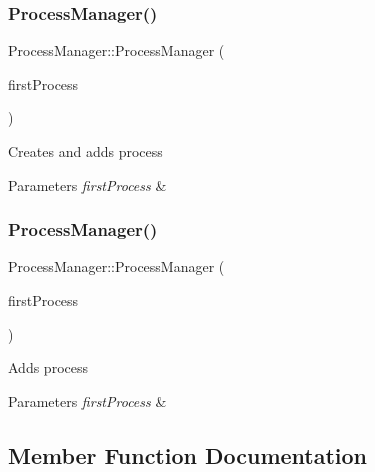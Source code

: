 \subsubsection{\texorpdfstring{Process\+Manager()}{ProcessManager()}\hspace{0.1cm}{\footnotesize\ttfamily [1/2]}}
{\footnotesize\ttfamily Process\+Manager\+::\+Process\+Manager (\begin{DoxyParamCaption}\item[{int}]{first\+Process }\end{DoxyParamCaption})}

Creates and adds process 
\begin{DoxyParams}{Parameters}
{\em first\+Process} & \\
\hline
\end{DoxyParams}
\mbox{\label{classProcessManager_ab8b145c5552462cbeb1b81cf085ac694}} 
\subsubsection{\texorpdfstring{Process\+Manager()}{ProcessManager()}\hspace{0.1cm}{\footnotesize\ttfamily [2/2]}}
{\footnotesize\ttfamily Process\+Manager\+::\+Process\+Manager (\begin{DoxyParamCaption}\item[{\hyperlink{classMemoryIndex}{Memory\+Index}}]{first\+Process }\end{DoxyParamCaption})}

Adds process 
\begin{DoxyParams}{Parameters}
{\em first\+Process} & \\
\hline
\end{DoxyParams}


\subsection{Member Function Documentation}
\mbox{\label{classProcessManager_ac2cbf900825382675f11911098fa0f66}} 
